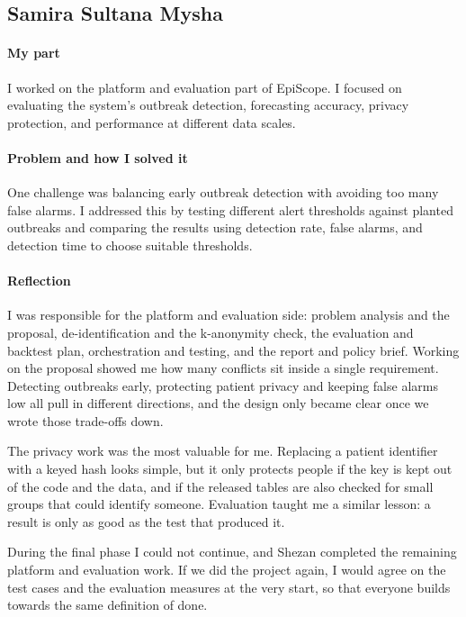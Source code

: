 \subsection*{Samira Sultana Mysha}
\paragraph*{My part} I worked on the platform and evaluation part of EpiScope. I focused on evaluating the
system's outbreak detection, forecasting accuracy, privacy protection, and performance at different data scales.

\paragraph*{Problem and how I solved it} One challenge was balancing early outbreak detection with avoiding too
many false alarms. I addressed this by testing different alert thresholds against planted outbreaks and comparing
the results using detection rate, false alarms, and detection time to choose suitable thresholds.

\paragraph*{Reflection} I was responsible for the platform and evaluation side: problem analysis and the proposal, de-identification and
the k-anonymity check, the evaluation and backtest plan, orchestration and testing, and the report and policy
brief. Working on the proposal showed me how many conflicts sit inside a single requirement. Detecting outbreaks
early, protecting patient privacy and keeping false alarms low all pull in different directions, and the design
only became clear once we wrote those trade-offs down.

The privacy work was the most valuable for me. Replacing a patient identifier with a keyed hash looks simple, but it
only protects people if the key is kept out of the code and the data, and if the released tables are also checked
for small groups that could identify someone. Evaluation taught me a similar lesson: a result is only as good as the
test that produced it.

During the final phase I could not continue, and Shezan completed the remaining platform and evaluation work. If we
did the project again, I would agree on the test cases and the evaluation measures at the very start, so that
everyone builds towards the same definition of done.
